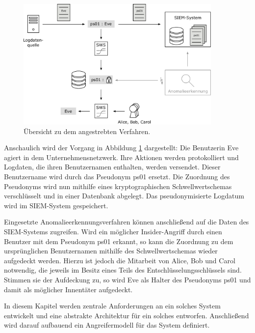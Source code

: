 \begin{figure}[]
    \centering
        \includegraphics[width=0.9\textwidth]{dia/overview.pdf}
    \caption{Übersicht zu dem angestrebten Verfahren.}
    \label{fig:overview_initial}
\end{figure}

Anschaulich wird der Vorgang in Abbildung \ref{fig:overview_initial} dargestellt: Die Benutzerin Eve agiert in dem Unternehmensnetzwerk. Ihre Aktionen werden protokolliert und Logdaten, die ihren Benutzernamen enthalten, werden versendet. Dieser Benutzername wird durch das Pseudonym ps01 ersetzt. Die Zuordnung des Pseudonyms wird nun mithilfe eines kryptographischen Schwellwertschemas verschlüsselt und in einer Datenbank abgelegt. Das pseudonymisierte Logdatum wird im SIEM-System gespeichert.

Eingesetzte Anomalieerkennungsverfahren können anschließend auf die Daten des SIEM-Systems zugreifen. Wird ein möglicher Insider-Angriff durch einen Benutzer mit dem Pseudonym ps01 erkannt, so kann die Zuordnung zu dem ursprünglichen Benutzernamen mithilfe des Schwellwertschemas wieder aufgedeckt werden. Hierzu ist jedoch die Mitarbeit von Alice, Bob und Carol notwendig, die jeweils im Besitz eines Teils des Entschlüsselungsschlüssels sind. Stimmen sie der Aufdeckung zu, so wird Eve als Halter des Pseudonyms ps01 und damit als möglicher Innentäter aufgedeckt.

In diesem Kapitel werden zentrale Anforderungen an ein solches System entwickelt und eine abstrakte Architektur für ein solches entworfen. Anschließend wird darauf aufbauend ein Angreifermodell für das System definiert.





